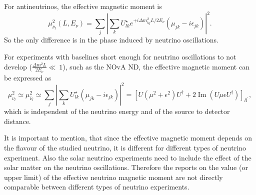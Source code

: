 For antineutrinos, the effective magnetic moment is
\begin{equation}
\mu_{\overline{\nu}_l}^2\left(L,E_{\nu}\right)=\sum_j\left|\sum_k U^{\star}_{lk}e^{+i\Delta m^2_{kj}L/2E_{\nu}}\left(\mu_{jk}-i\epsilon_{jk}\right)\right|^2.
\end{equation}
So the only difference is in the phase induced by neutrino oscillations.

For experiments with baselines short enough for neutrino oscillations to not develop ($\frac{\Delta m^2L}{2E_{\nu}}\ll~1$), such as the NOvA ND, the effective magnetic moment can be expressed as
\begin{equation}
\mu_{\nu_l}^2\simeq\mu_{\overline{\nu}_l}^2\simeq\sum_j\left|\sum_k U_{lk}^{\star}\left(\mu_{jk}-i\epsilon_{jk}\right)\right|^2=\left[U\left(\mu^2+\epsilon^2\right)U^{\dagger}+2\operatorname{Im}\left(U\mu\epsilon U^{\dagger}\right)\right]_{ll^{\prime}},
\end{equation}
which is independent of the neutrino energy and of the source to detector distance.

It is important to mention, that since the effective magnetic moment depends on the flavour of the studied neutrino, it is different for different types of neutrino experiment. Also the solar neutrino experiments need to include the effect of the solar matter on the neutrino oscillations. Therefore the reports on the value (or upper limit) of the effective neutrino magnetic moment are not directly comparable between different types of neutrino experiments.

